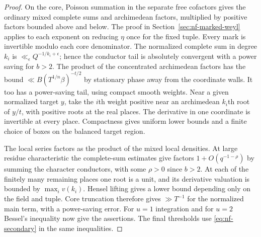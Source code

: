 \documentclass[11pt,letterpaper]{article}
\theoremstyle{definition}
\numberwithin{equation}{section}
\begin{document}
\begin{proof}
On the core, Poisson summation in the separate free cofactors gives the
ordinary mixed complete sums and archimedean factors, multiplied by
positive factors bounded above and below. The proof in
Section~\ref{sec:nf-marked-weyl} applies to each exponent on reducing
$\eta$ once for the fixed tuple. Every mark is invertible modulo
each core denominator. The normalized complete sum in degree $k_i$
is $\ll_\epsilon Q^{-1/k_i+\epsilon}$; hence the conductor tail is
absolutely convergent with a power saving for $b>2$.
The product of the concentrated archimedean factors has the bound
$\ll B(T^{1/n}\beta)^{-t/2}$ by stationary phase away from the
coordinate walls. It too has a power-saving tail, using compact
smooth weights. Near a given normalized target $y$, take the $i$th
weight positive near an archimedean $k_i$th root of $y/t$, with positive
roots at the real places. The derivative in one coordinate is
invertible at every place. Compactness gives uniform lower bounds and
a finite choice of boxes on the balanced target region.

The local series factors as the product of the mixed local
densities. At large residue characteristic the complete-sum estimates
give factors $1+O(q^{-1-\rho})$ by summing the character conductors,
with some $\rho>0$ since $b>2$. At each of the finitely many remaining
places one root is a unit, and its derivative valuation is bounded
by $\max_i v(k_i)$. Hensel lifting gives a lower bound depending
only on the field and tuple. Core truncation therefore gives
$\gg T^{-1}$ for the normalized main term, with a power-saving
error. For $u=1$ integration and for $u=2$ Bessel's inequality now
give the assertions. The final thresholds use
\eqref{eq:nf-secondary} in the same inequalities.
\end{proof}
\end{document}
